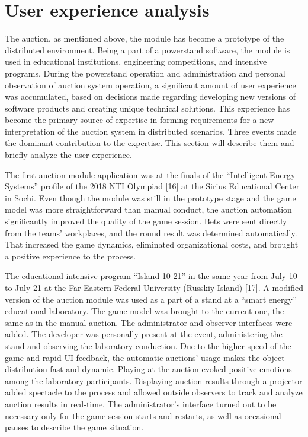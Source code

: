 \documentclass[
]{ceurart}
\begin{document}
\section{User experience analysis}
\label{sec:user-exp}

The auction, as mentioned above, the module has become a prototype of the distributed environment. Being a part of a powerstand software, the module is used in educational institutions, engineering competitions, and intensive programs. During the powerstand operation and administration and personal observation of auction system operation, a significant amount of user experience was accumulated, based on decisions made regarding developing new versions of software products and creating unique technical solutions. This experience has become the primary source of expertise in forming requirements for a new interpretation of the auction system in distributed scenarios. Three events made the dominant contribution to the expertise. This section will describe them and briefly analyze the user experience.

The first auction module application was at the finals of the “Intelligent Energy Systems” profile of the 2018 NTI Olympiad [16] at the Sirius Educational Center in Sochi. Even though the module was still in the prototype stage and the game model was more straightforward than manual conduct, the auction automation significantly improved the quality of the game session. Bets were sent directly from the teams’ workplaces, and the round result was determined automatically. That increased the game dynamics, eliminated organizational costs, and brought a positive experience to the process.

The educational intensive program ``Island 10-21'' in the same year from July 10 to July 21 at the Far Eastern Federal University (Russkiy Island) [17]. A modified version of the auction module was used as a part of a stand at a ``smart energy'' educational laboratory. The game model was brought to the current one, the same as in the manual auction. The administrator and observer interfaces were added. The developer was personally present at the event, administering the stand and observing the laboratory conduction. Due to the higher speed of the game and rapid UI feedback, the automatic auctions' usage makes the object distribution fast and dynamic. Playing at the auction evoked positive emotions among the laboratory participants. Displaying auction results through a projector added spectacle to the process and allowed outside observers to track and analyze auction results in real-time. The administrator's interface turned out to be necessary only for the game session starts and restarts, as well as occasional pauses to describe the game situation.
\end{document}
